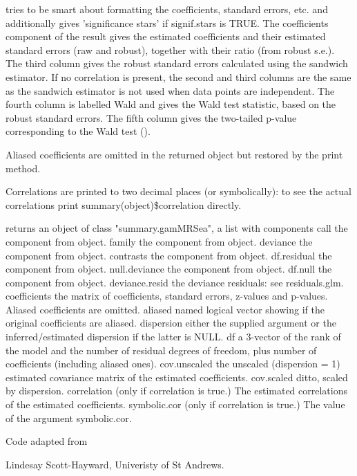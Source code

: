 \documentclass[a4paper]{book}
\begin{document}
\begin{Details}\relax
{} tries to be smart about formatting the coefficients, standard errors, etc. and additionally gives 'significance stars' if signif.stars is TRUE. The coefficients component of the result gives the estimated coefficients and their estimated standard errors (raw and robust), together with their ratio (from robust s.e.). The third column gives the robust standard errors calculated using the sandwich estimator.  If no correlation is present, the second and third columns are the same as the sandwich estimator is not used when data points are independent. The fourth column is labelled Wald and gives the Wald test statistic, based on the robust standard errors. The fifth column gives the two-tailed p-value corresponding to the Wald test ().

Aliased coefficients are omitted in the returned object but restored by the print method.

Correlations are printed to two decimal places (or symbolically): to see the actual correlations print summary(object)\$correlation directly.

 returns an object of class "summary.gamMRSea", a list with components
call	the component from object.
family	the component from object.
deviance	the component from object.
contrasts the component from object.
df.residual	the component from object.
null.deviance	the component from object.
df.null	the component from object.
deviance.resid	the deviance residuals: see residuals.glm.
coefficients	the matrix of coefficients, standard errors, z-values and p-values. Aliased coefficients are omitted.
aliased	named logical vector showing if the original coefficients are aliased.
dispersion	either the supplied argument or the inferred/estimated dispersion if the latter is NULL.
df	a 3-vector of the rank of the model and the number of residual degrees of freedom, plus number of coefficients (including aliased ones).
cov.unscaled	the unscaled (dispersion = 1) estimated covariance matrix of the estimated coefficients.
cov.scaled	ditto, scaled by dispersion.
correlation	(only if correlation is true.) The estimated correlations of the estimated coefficients.
symbolic.cor	(only if correlation is true.) The value of the argument symbolic.cor.
\end{Details}
%
\begin{Note}\relax
Code adapted from 
\end{Note}
%
\begin{Author}\relax
Lindesay Scott-Hayward, Univeristy of St Andrews.
\end{Author}
\end{document}
